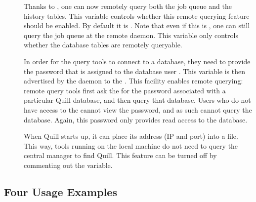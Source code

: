 \begin{description}
\item[]
Thanks to 
,
one can now remotely query both the job queue and the
history tables. This variable controls whether this remote querying 
feature should be enabled.  By default it is .  Note that even if 
this is , one can still query the job queue 
at the remote  daemon.
This variable only controls whether the database tables are remotely queryable.

\item[]
In order for the query tools to connect to a database, they need to provide
the password that is assigned to the database user . 
This variable is then advertised by the  daemon
to the .  
This facility enables remote querying: remote  query tools first 
ask the  for
the password associated with a particular Quill database, 
and then query that database.  Users who do not have access to the 
cannot view the password, and as such cannot query the database.  Again, this 
password only provides read access to the database.

\item[]
When Quill starts up, it can place its address (IP and port)
into a file.  This way, tools running on the local machine do not
need to query the central manager to find Quill.  This 
feature can be turned off by commenting out the variable.

\end{description}


\subsection{\label{sec:Quill-Example}Four Usage Examples}


